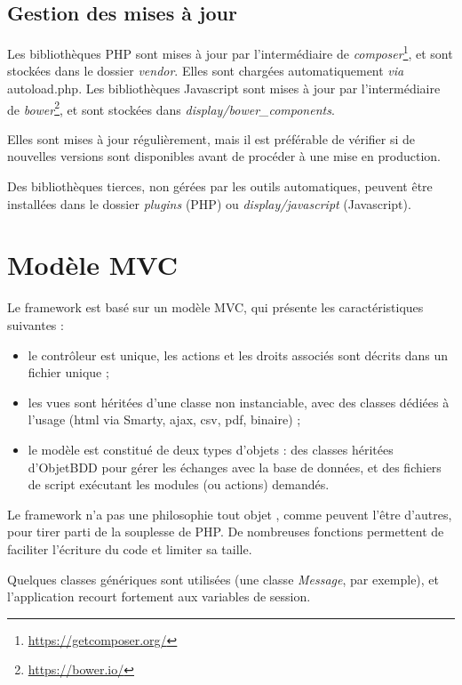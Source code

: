 \subsection{Gestion des mises à jour}
Les bibliothèques PHP sont mises à jour par l'intermédiaire de \textit{composer}\footnote{\href{https://getcomposer.org/}{https://getcomposer.org/}}, et sont stockées dans le dossier \textit{vendor}. Elles sont chargées automatiquement \textit{via} autoload.php.
Les bibliothèques Javascript sont mises à jour par l'intermédiaire de \textit{bower}\footnote{\href{https://bower.io/}{https://bower.io/}}, et sont stockées dans \textit{display/bower\_components}.

Elles sont mises à jour régulièrement, mais il est préférable de vérifier si de nouvelles versions sont disponibles avant de procéder à une mise en production.

Des bibliothèques tierces, non gérées par les outils automatiques, peuvent être installées dans le dossier \textit{plugins} (PHP) ou \textit{display/javascript} (Javascript).

\section{Modèle MVC}

Le framework est basé sur un modèle MVC, qui présente les caractéristiques suivantes :
\begin{itemize}
\item le contrôleur est unique, les actions et les droits associés sont décrits dans un fichier unique ;
\item les vues sont héritées d'une classe non instanciable, avec des classes dédiées à l'usage (html via Smarty, ajax, csv, pdf, binaire) ;
\item le modèle est constitué de deux types d'objets : des classes héritées d'ObjetBDD pour gérer les échanges avec la base de données, et des fichiers de script exécutant les modules (ou actions) demandés.
\end{itemize}

Le framework n'a pas une philosophie \og tout objet \fg{}, comme peuvent l'être d'autres, pour tirer parti de la souplesse de PHP. De nombreuses fonctions permettent de faciliter l'écriture du code et limiter sa taille.

Quelques classes génériques sont utilisées (une classe \textit{Message}, par exemple), et l'application recourt fortement aux variables de session. 

